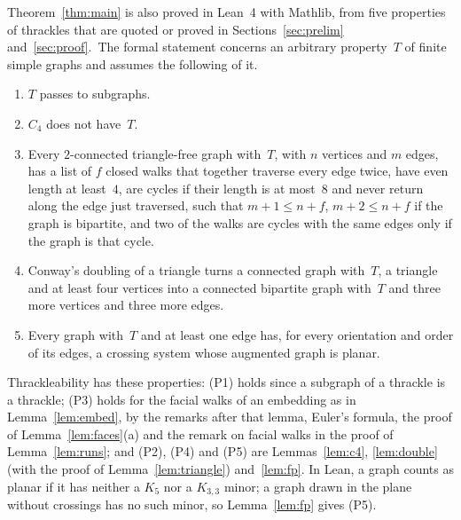 \documentclass[11pt]{amsart}
\theoremstyle{definition}
\theoremstyle{remark}
\numberwithin{equation}{section}
\begin{document}
Theorem~\ref{thm:main} is also proved in Lean~4 with Mathlib, from five properties of thrackles that are quoted or proved in Sections~\ref{sec:prelim} and~\ref{sec:proof}.\ The formal statement concerns an arbitrary property~$T$ of finite simple graphs and assumes the following of it.
\begin{enumerate}[label=(P\arabic*)]
\item $T$ passes to subgraphs.
\item $C_4$ does not have~$T$.
\item Every $2$-connected triangle-free graph with~$T$, with $n$ vertices and $m$ edges, has a list of $f$ closed walks that together traverse every edge twice, have even length at least~$4$, are cycles if their length is at most~$8$ and never return along the edge just traversed, such that $m+1\le n+f$, $m+2\le n+f$ if the graph is bipartite, and two of the walks are cycles with the same edges only if the graph is that cycle.
\item Conway's doubling of a triangle turns a connected graph with~$T$, a triangle and at least four vertices into a connected bipartite graph with~$T$ and three more vertices and three more edges.
\item Every graph with~$T$ and at least one edge has, for every orientation and order of its edges, a crossing system whose augmented graph is planar.
\end{enumerate}
Thrackleability has these properties: (P1) holds since a subgraph of a thrackle is a thrackle; (P3) holds for the facial walks of an embedding as in Lemma~\ref{lem:embed}, by the remarks after that lemma, Euler's formula, the proof of Lemma~\ref{lem:faces}(a) and the remark on facial walks in the proof of Lemma~\ref{lem:runs}; and (P2), (P4) and (P5) are Lemmas~\ref{lem:c4}, \ref{lem:double} (with the proof of Lemma~\ref{lem:triangle}) and~\ref{lem:fp}. In Lean, a graph counts as planar if it has neither a $K_5$ nor a $K_{3,3}$ minor; a graph drawn in the plane without crossings has no such minor, so Lemma~\ref{lem:fp} gives (P5).
\end{document}
